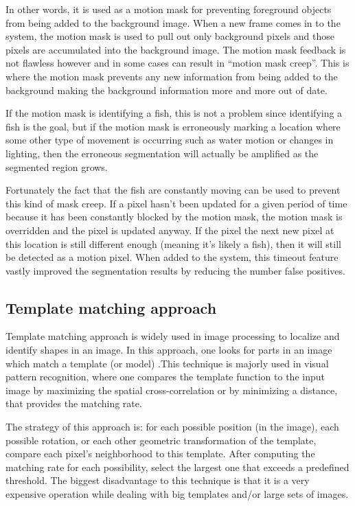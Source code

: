 In other words, it is used as a motion mask for preventing foreground objects from being added to the background image. When a new frame comes in to the system, the motion mask is used to pull out only background pixels and those pixels are accumulated into the background image.
The motion mask feedback is not flawless however and in some cases can result in “motion mask creep”. This is where the motion mask prevents any new information from being added to the background making the background information more and more out of date. 

If the motion mask is identifying a fish, this is not a problem since identifying a fish is the goal, but if the motion mask is erroneously marking a location where some other type of movement is occurring such as water motion or changes in lighting, then the erroneous segmentation will actually be amplified as the segmented region grows.

Fortunately the fact that the fish are constantly moving can be used to prevent this kind of mask creep. If a pixel hasn’t been updated for a given period of time because it has been constantly blocked by the motion mask, the motion mask is overridden and the pixel is updated anyway. If the pixel the next new pixel at this location is still different enough (meaning it’s likely a fish), then it will still be detected as a motion pixel. When added to the system, this timeout feature vastly improved the segmentation results by reducing the number false positives.

\subsection{Template matching approach}
Template matching approach is widely used in image processing to localize and identify shapes in an image. In this approach, one looks for parts in an image which match a template (or model)  \cite{vilenkin}.This technique is majorly used in visual pattern recognition, where one compares the template function to the input image by maximizing the spatial cross-correlation or by minimizing a distance, that provides the matching rate.

The strategy of this approach is: for each possible position (in the image), each possible rotation, or each other geometric transformation of the template, compare each pixel’s neighborhood to this template. After computing the matching rate for each possibility, select the largest one that exceeds a predefined threshold. The biggest disadvantage to this technique is that it is a very expensive operation while dealing with big templates and/or large sets of images. 